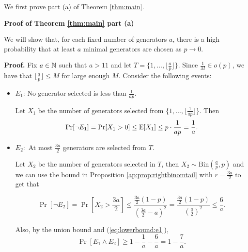 We first prove part (a) of Theorem \ref{thm:main}. 

\textbf{Proof of Theorem \ref{thm:main} part (a)}

We will show that, for each fixed number of generators $a$, there is a high probability that at least $a$ minimal generators are chosen as $p \to 0$.

\textbf{Proof. }
Fix $a \in \mathbb{N}$ such that $a > 11$ and let $T = \{1, \ldots, \lfloor\frac{a}{p}\rfloor\}$. Since   $\frac{1}{M} \in o(p)$, we have that $\lfloor\frac{a}{p}\rfloor \leq M$ for large enough $M$. Consider the following events:
\begin{itemize}
    \item $E_1$: No generator selected is less than $\frac{1}{ap}$.  \par
    Let $X_1$ be the number of generators selected from $\{1,\ldots,\lfloor\frac{1}{ap}\rfloor\}$. Then 
    \begin{equation}\label{eq:lowerbound:e1}
    \mathrm{Pr}[\lnot E_1] = \mathrm{Pr}[X_1 > 0] \leq \mathrm{E}[X_1] \leq p \cdot \frac{1}{ap} = \frac{1}{a}.
    \end{equation}

    \item $E_2:$ At most $\frac{3a}{2}$ generators are selected from $T$.\par 
    Let $X_2$ be the number of generators selected in $T$, then $X_2 \sim \mathrm{Bin}(\frac{a}{p}, p)$ and we can use the bound in Proposition \ref{ap:prop:rightbinomtail} with $r = \frac{3a}{2}$ to get that

    \[\Pr[\lnot E_2] = \Pr\left[X_2 > \frac{3a}{2}\right] \leq  \frac{\frac{3a}{2}(1 - p)}{(\frac{3a}{2} - a)^2} = \frac{\frac{3a}{2}(1 - p)}{(\frac{a}{2})^2}\leq \frac{6}{a}.\]

    Also, by the union bound and (\ref{eq:lowerbound:e1}),
    \begin{equation}\label{eq:lowerbound:e1ande2}
     \Pr[E_1\land E_2] \geq 1 - \frac{1}{a} - \frac{6}{a} = 1 - \frac{7}{a}.
    \end{equation}


\end{itemize}
